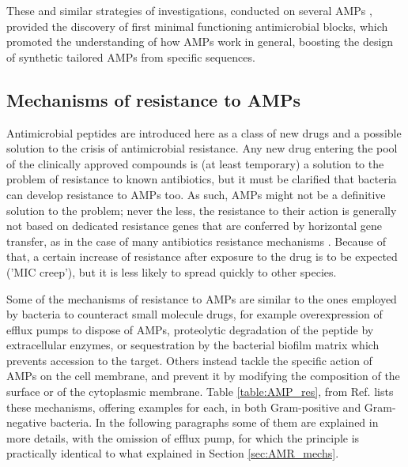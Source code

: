 These and similar strategies of investigations, conducted on several AMPs \cite{???}, provided the discovery of first minimal functioning antimicrobial blocks, which promoted the understanding of how AMPs work in general, boosting the design of synthetic tailored AMPs from specific sequences.


\subsection{Mechanisms of resistance to AMPs}

Antimicrobial peptides are introduced here as a class of new drugs and a possible solution to the crisis of antimicrobial resistance. Any new drug entering the pool of the clinically approved compounds is (at least temporary) a solution to the problem of resistance to known antibiotics, but it must be clarified that bacteria can develop resistance to AMPs too.
%
As such, AMPs might not be a definitive solution to the problem; never the less, the resistance to their action is generally not based on dedicated resistance genes that are conferred by horizontal gene transfer, as in the case of many antibiotics resistance mechanisms \cite{Peschel2006,Juhas2015}.
Because of that, a certain increase of resistance after exposure to the drug is to be expected ('MIC creep'), %
but it is less likely to spread quickly to other species.

Some of the mechanisms of resistance to AMPs are similar to the ones employed by bacteria to counteract small molecule drugs, for example overexpression of efflux pumps to dispose of AMPs, proteolytic degradation of the peptide by extracellular enzymes, or sequestration by the bacterial biofilm matrix which prevents accession to the target. Others instead tackle the specific action of AMPs on the cell membrane, and prevent it by modifying the composition of the surface or of the cytoplasmic membrane. Table \ref{table:AMP_res}, from Ref. \cite{Joo2016} lists these mechanisms, offering examples for each, in both Gram-positive and Gram-negative bacteria.
%
In the following paragraphs some of them are explained in more details, with the omission of efflux pump, for which the principle is practically identical to what explained in Section \ref{sec:AMR_mechs}.

